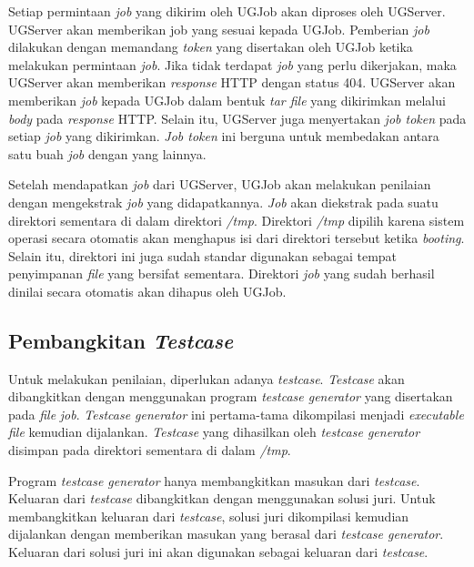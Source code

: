 \par Setiap permintaan \textit{job} yang dikirim oleh UGJob akan diproses oleh UGServer. UGServer akan memberikan job yang sesuai kepada UGJob. Pemberian \textit{job} dilakukan dengan memandang \textit{token} yang disertakan oleh UGJob ketika melakukan permintaan \textit{job}. Jika tidak terdapat \textit{job} yang perlu dikerjakan, maka UGServer akan memberikan \textit{response} HTTP dengan status 404. UGServer akan memberikan \textit{job} kepada UGJob dalam bentuk \textit{tar file} yang dikirimkan melalui \textit{body} pada \textit{response} HTTP. Selain itu, UGServer juga menyertakan \textit{job token} pada setiap \textit{job} yang dikirimkan. \textit{Job token} ini berguna untuk membedakan antara satu buah \textit{job} dengan yang lainnya.

\par Setelah mendapatkan \textit{job} dari UGServer, UGJob akan melakukan penilaian dengan mengekstrak \textit{job} yang didapatkannya. \textit{Job} akan diekstrak pada suatu direktori sementara di dalam direktori \textit{/tmp}. Direktori \textit{/tmp} dipilih karena sistem operasi secara otomatis akan menghapus isi dari direktori tersebut ketika \textit{booting}. Selain itu, direktori ini juga sudah standar digunakan sebagai tempat penyimpanan \textit{file} yang bersifat sementara. Direktori \textit{job} yang sudah berhasil dinilai secara otomatis akan dihapus oleh UGJob. 

\subsection{Pembangkitan \textit{Testcase}}

\par Untuk melakukan penilaian, diperlukan adanya \textit{testcase}. \textit{Testcase} akan dibangkitkan dengan menggunakan program \textit{testcase generator} yang disertakan pada \textit{file} \textit{job}. \textit{Testcase generator} ini pertama-tama dikompilasi menjadi \textit{executable file} kemudian dijalankan. \textit{Testcase} yang dihasilkan oleh \textit{testcase generator} disimpan pada direktori sementara di dalam \textit{/tmp}.


\par Program \textit{testcase generator} hanya membangkitkan masukan dari \textit{testcase}. Keluaran dari \textit{testcase} dibangkitkan dengan menggunakan solusi juri. Untuk membangkitkan keluaran dari \textit{testcase}, solusi juri dikompilasi kemudian dijalankan dengan memberikan masukan yang berasal dari \textit{testcase generator}. Keluaran dari solusi juri ini akan digunakan sebagai keluaran dari \textit{testcase}.

